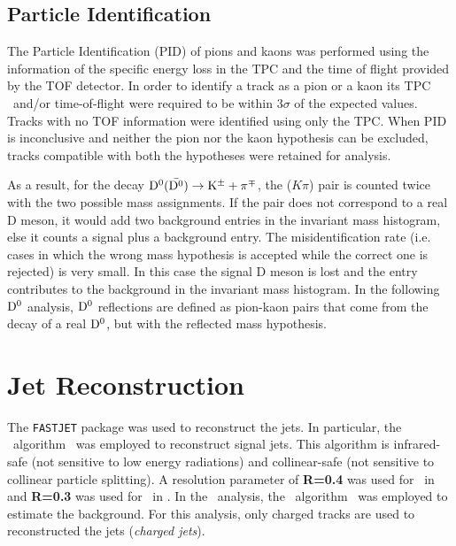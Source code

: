 \subsection{Particle Identification}

The Particle Identification (PID) of pions and kaons was performed using the information of the specific energy loss 
in the TPC and the time of flight provided by the TOF detector. 
In order to identify a track as a pion or a kaon its TPC \dedx\ and/or time-of-flight were required to be within 3$\sigma$ of the expected values. 
Tracks with no TOF information were identified using only the TPC.
When PID is inconclusive and neither the pion nor the kaon hypothesis can be excluded, tracks compatible with both the hypotheses 
were retained for analysis.

As a result, for the decay $\mathrm{D^{0}} (\bar{\mathrm{D^{0}}}) \to {\rm K}^{\pm} + \pi^{\mp}$, the ($K\pi$) pair is counted twice with the two possible mass assignments. If the pair does not correspond
to a real D meson, it would add two background entries in the invariant mass histogram, else it 
counts a signal plus a background entry. 
The misidentification rate (i.e. cases in which the wrong mass
hypothesis is accepted while the correct one is rejected) is very small. In this case the signal D meson
is lost and the entry contributes to the background in the invariant mass histogram. In the following $\mathrm{D^{0}}$ analysis, $\mathrm{D^{0}}$
reflections are defined as pion-kaon pairs that come from the decay of a real $\mathrm{D^{0}}$, but with the reflected mass hypothesis.



\section{Jet Reconstruction}

The \texttt{FASTJET}\cite{Cacciari:2012} package was used to reconstruct the jets. 
In particular, the \antikt\ algorithm~\cite{Cacciari:2008c} was employed to reconstruct signal jets. 
This algorithm is infrared-safe (not sensitive to low energy radiations) and collinear-safe (not sensitive to collinear particle splitting).
A resolution parameter of {\textbf{R=0.4}} was used for \Dstar\ in \pPb\, and {\textbf{R=0.3}} was used for \Dzero\ in \pPb.
In the \pPb\ analysis, the \kt\ algorithm~\cite{Cacciari:2006} was employed to estimate the background. 
For this analysis, only charged tracks are used to reconstructed the jets (\emph{charged jets}).

